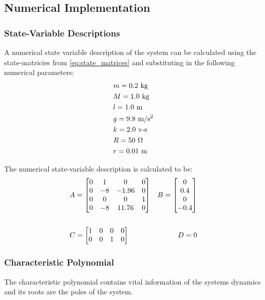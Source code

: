 \documentclass[]{article}
\begin{document}
	\subsection{Numerical Implementation}
		\subsubsection{State-Variable Descriptions}
			A numerical state variable description of the system can be calculated using the state-matricies from \eqref{eq:state_matrices} and substituting in the following numerical parameters:
			\begin{align*}
				&m = 0.2 \ \text{kg} \\
				&M = 1.0 \ \text{kg} \\
				&l = 1.0 \ \text{m} \\
				&g = 9.8 \ \text{m/s\textsuperscript{2}} \\
				&k = 2.0 \ \text{v-s} \\
				&R = 50  \ \Omega \\
				&r = 0.01 \ \text{m}
			\end{align*}
			
			The numerical state-variable description is calculated to be:
			\begin{equation}
				\begin{aligned}
					&A = \mqty[	0 & 1 	& 0 	& 0\\
								0 & -8	& -1.96 & 0 \\
								0 & 0	& 0 	& 1\\
								0 & -8	& 11.76	& 0	]
					&B = \mqty[	0\\
								0.4\\
								0\\
								-0.4] \\ && \\
					&C = \mqty[	1 & 0 & 0 & 0\\
								0 & 0 & 1 & 0]
					&D = 0
				\end{aligned}
				\label{eq:pendulum_state_matrices}
			\end{equation}
		
		\subsubsection{Characteristic Polynomial}
			
			The characteristic polynomial contains vital information of the systems dynamics and its roots are the poles of the system.
			
\end{document}
